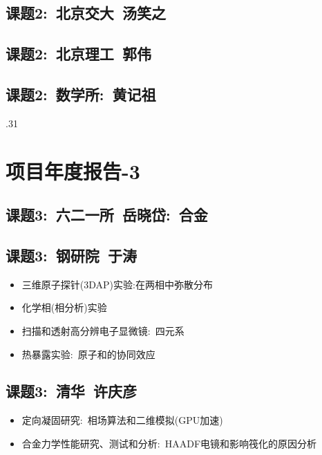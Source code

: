 \documentclass[10pt,a4paper]{article}
\begin{document}
\subsection{课题2:~北京交大~汤笑之}

\subsection{课题2:~北京理工~郭伟}

\subsection{课题2:~数学所:~黄记祖}

.31
\section{项目年度报告-3}
\subsection{课题3:~六二一所~岳晓岱:~合金}

\subsection{课题3:~钢研院~于涛}
\begin{itemize}
	\item 三维原子探针(\textrm{3DAP})实验:在两相中弥散分布
	\item 化学相(相分析)实验
	\item 扫描和透射高分辨电子显微镜:~四元系
	\item 热暴露实验:~原子和的协同效应
\end{itemize}

\subsection{课题3:~清华~许庆彦}
\begin{itemize}
	\item 定向凝固研究:~相场算法和二维模拟(\textrm{GPU}加速)
	\item 合金力学性能研究、测试和分析:~\textrm{HAADF}电镜和影响筏化的原因分析
\end{itemize}
\end{document}
